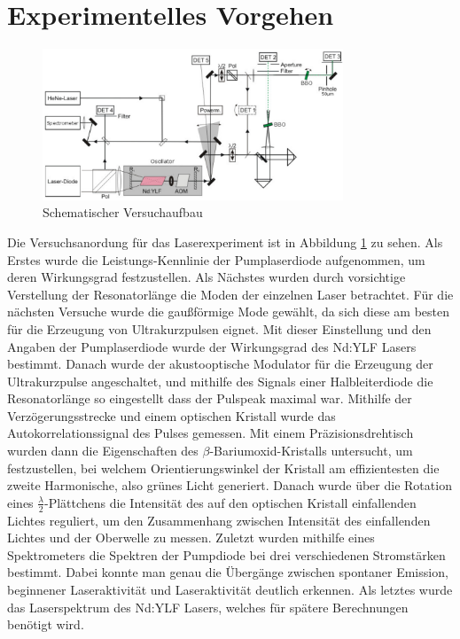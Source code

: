 \section{Experimentelles Vorgehen}
\begin{figure}[]
  \centering
  \includegraphics[width = 0.8\textwidth]{Bilder/Versuchsaufbau.png}
  \caption{Schematischer Versuchaufbau}
  \label{fig:versuchsaufbau}
\end{figure}
Die Versuchsanordung für das Laserexperiment ist in Abbildung \ref{fig:versuchsaufbau}
zu sehen. Als Erstes wurde die Leistungs-Kennlinie der Pumplaserdiode aufgenommen, um deren Wirkungsgrad festzustellen.
Als Nächstes wurden durch vorsichtige Verstellung der Resonatorlänge die Moden der einzelnen Laser betrachtet.
Für die nächsten Versuche wurde die gaußförmige Mode gewählt, da sich diese am besten für
die Erzeugung von Ultrakurzpulsen eignet.
Mit dieser Einstellung und den Angaben der Pumplaserdiode wurde der
Wirkungsgrad des Nd:YLF Lasers bestimmt. 
Danach wurde der akustooptische Modulator für die Erzeugung der Ultrakurzpulse angeschaltet, und mithilfe des Signals einer Halbleiterdiode die Resonatorlänge so eingestellt dass der Pulspeak maximal war.
Mithilfe der Verzögerungsstrecke und einem optischen Kristall wurde das Autokorrelationssignal des Pulses gemessen.
Mit einem Präzisionsdrehtisch wurden dann die Eigenschaften des $\beta$-Bariumoxid-Kristalls untersucht, um festzustellen, bei welchem Orientierungswinkel der Kristall am effizientesten die zweite Harmonische, also grünes Licht generiert.
Danach wurde über die Rotation eines $\frac{\lambda}{2}$-Plättchens die Intensität des auf den optischen Kristall einfallenden Lichtes reguliert, um den Zusammenhang zwischen Intensität des einfallenden Lichtes und der Oberwelle zu messen.
Zuletzt wurden mithilfe eines Spektrometers die Spektren der Pumpdiode bei drei verschiedenen Stromstärken bestimmt. Dabei konnte man genau die Übergänge zwischen spontaner Emission, beginnener Laseraktivität und Laseraktivität deutlich erkennen. Als letztes wurde das Laserspektrum des Nd:YLF Lasers, welches für spätere Berechnungen benötigt wird.

